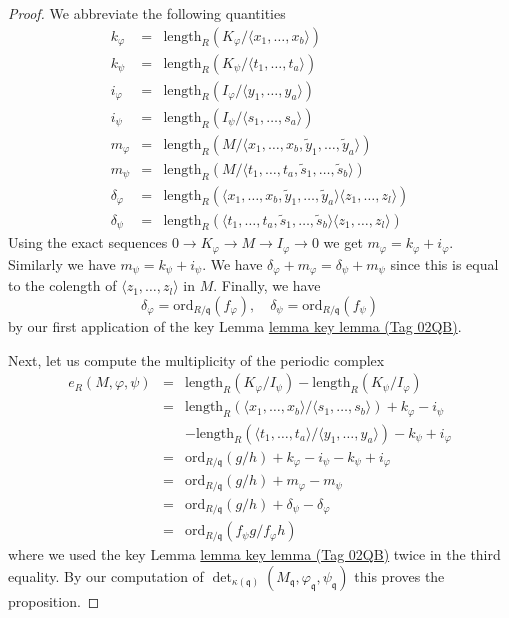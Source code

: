 \documentclass{amsart}
\theoremstyle{plain}
\theoremstyle{definition}
\theoremstyle{remark}
\numberwithin{equation}{subsection}
\begin{document}
\begin{proof}
\medskip\noindent
We abbreviate the following quantities
\begin{eqnarray*}
k_\varphi & = & \text{length}_R(K_\varphi/\langle x_1, \ldots, x_b\rangle) \\
k_\psi    & = & \text{length}_R(K_\psi/\langle t_1, \ldots, t_a\rangle) \\
i_\varphi & = & \text{length}_R(I_\varphi/\langle y_1, \ldots, y_a\rangle) \\
i_\psi    & = & \text{length}_R(I_\psi/\langle s_1, \ldots, s_a\rangle) \\
m_\varphi & = & \text{length}_R(M/
\langle x_1, \ldots, x_b, \tilde y_1, \ldots, \tilde y_a\rangle) \\
m_\psi    & = & \text{length}_R(M/
\langle t_1, \ldots, t_a, \tilde s_1, \ldots, \tilde s_b\rangle) \\
\delta_\varphi & = & \text{length}_R(
\langle x_1, \ldots, x_b, \tilde y_1, \ldots, \tilde y_a\rangle
\langle z_1, \ldots, z_l\rangle) \\
\delta_\psi & = & \text{length}_R(
\langle t_1, \ldots, t_a, \tilde s_1, \ldots, \tilde s_b\rangle
\langle z_1, \ldots, z_l\rangle)
\end{eqnarray*}
Using the exact sequences $0 \to K_\varphi \to M \to I_\varphi \to 0$
we get $m_\varphi = k_\varphi + i_\varphi$. Similarly we have
$m_\psi = k_\psi + i_\psi$. We have
$\delta_\varphi + m_\varphi = \delta_\psi + m_\psi$ since this
is equal to the colength of $\langle z_1, \ldots, z_l \rangle$
in $M$. Finally, we have
$$
\delta_\varphi = \text{ord}_{R/\mathfrak q}(f_\varphi),
\quad
\delta_\psi = \text{ord}_{R/\mathfrak q}(f_\psi)
$$
by our first application of the key Lemma \href{https://stacks.math.columbia.edu/tag/02QB}{lemma key lemma (Tag 02QB)}.

\medskip\noindent
Next, let us compute the multiplicity of the periodic complex
\begin{eqnarray*}
e_R(M, \varphi, \psi) & = &
\text{length}_R(K_\varphi/I_\psi) - \text{length}_R(K_\psi/I_\varphi) \\
& = &
\text{length}_R(
\langle x_1, \ldots, x_b\rangle/
\langle s_1, \ldots, s_b\rangle)
+ k_\varphi - i_\psi \\
& & -
\text{length}_R(
\langle t_1, \ldots, t_a\rangle/
\langle y_1, \ldots, y_a\rangle)
- k_\psi + i_\varphi \\
& = &
\text{ord}_{R/\mathfrak q}(g/h) + k_\varphi - i_\psi - k_\psi + i_\varphi \\
& = &
\text{ord}_{R/\mathfrak q}(g/h) + m_\varphi - m_\psi \\
& = &
\text{ord}_{R/\mathfrak q}(g/h) + \delta_\psi - \delta_\varphi \\
& = &
\text{ord}_{R/\mathfrak q}(f_\psi g/f_\varphi h)
\end{eqnarray*}
where we used the key Lemma \href{https://stacks.math.columbia.edu/tag/02QB}{lemma key lemma (Tag 02QB)} twice in the third equality.
By our computation of $\det_{\kappa(\mathfrak q)}
(M_{\mathfrak q}, \varphi_{\mathfrak q}, \psi_{\mathfrak q})$
this proves the proposition.
\end{proof}
\end{document}
